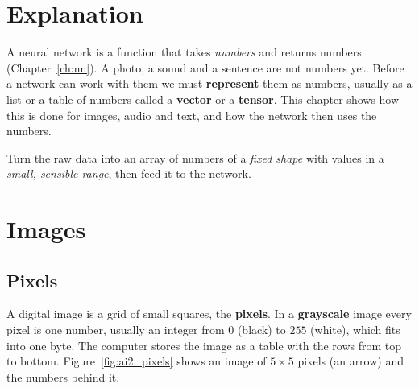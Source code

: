 \label{ch:ai2}

\section*{Explanation}
A neural network is a function that takes \emph{numbers} and returns numbers (Chapter~\ref{ch:nn}). A photo, a sound and a sentence are not numbers yet. Before a network can work with them we must \textbf{represent} them as numbers, usually as a list or a table of numbers called a \textbf{vector} or a \textbf{tensor}. This chapter shows how this is done for images, audio and text, and how the network then uses the numbers.

\begin{keyidea}
Turn the raw data into an array of numbers of a \emph{fixed shape} with values in a \emph{small, sensible range}, then feed it to the network.
\end{keyidea}

\section*{Images}
\subsection*{Pixels}
A digital image is a grid of small squares, the \textbf{pixels}. In a \textbf{grayscale} image every pixel is one number, usually an integer from $0$ (black) to $255$ (white), which fits into one byte. The computer stores the image as a table with the rows from top to bottom. Figure~\ref{fig:ai2_pixels} shows an image of $5\times5$ pixels (an arrow) and the numbers behind it.

\begin{center}
\label{fig:ai2_pixels}
\end{center}

